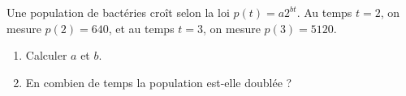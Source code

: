 \begin{exercice}\label{exo2}

Une population de bactéries croît selon la loi $p(t)=a 2^{bt}$. Au temps $t=2$, on mesure $p(2)=640$, et au temps $t=3$, on mesure $p(3)=5120$.
\begin{enumerate}

\item
 Calculer $a$ et $b$. 

\item
En combien de temps la population est-elle doublée ?

\end{enumerate}

\end{exercice}
